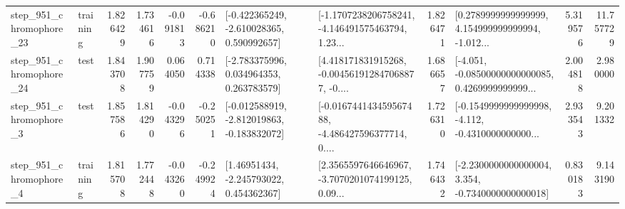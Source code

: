 \begin{tabular}{llrrrrllrlrr}
  step\_951\_chromophore\_23 &  training &      1.826429 &    1.734616 &     -0.091813 & -0.686210 &   [-0.422365249, -2.610028365, 0.590992657] &  [-1.1707238206758241, -4.146491575463794, 1.23... &       1.826471 &  [0.2789999999999999, 4.154999999999994, -1.012... &            5.319576 &         11.757729 \\
  step\_951\_chromophore\_24 &      test &      1.843708 &    1.907759 &      0.064050 &  0.714338 &    [-2.783375996, 0.034964353, 0.263783579] &  [4.418171831915268, -0.004561912847068877, -0.... &       1.686657 &  [-4.051, -0.08500000000000085, 0.4269999999999... &            2.004818 &          2.980000 \\
   step\_951\_chromophore\_3 &      test &      1.857586 &    1.814290 &     -0.043296 & -0.250251 &  [-0.012588919, -2.812019863, -0.183832072] &  [-0.016744143459567488, -4.486427596377714, 0.... &       1.726310 &  [-0.1549999999999998, -4.112, -0.4310000000000... &            2.933543 &          9.201332 \\
   step\_951\_chromophore\_4 &  training &      1.815708 &    1.772448 &     -0.043260 & -0.249924 &     [1.46951434, -2.245793022, 0.454362367] &  [2.3565597646646967, -3.7070201074199125, 0.09... &       1.746432 &  [-2.2300000000000004, 3.354, -0.7340000000000018] &            0.830183 &          9.143190 \\
\bottomrule
\end{tabular}


